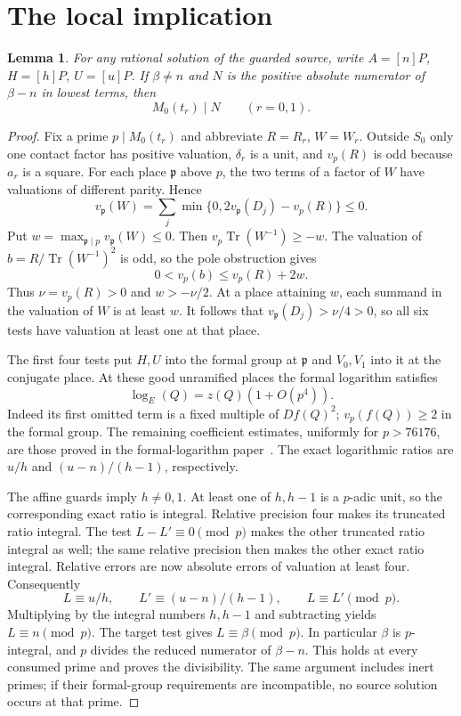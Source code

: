 \documentclass[11pt,a4paper]{article}
\newtheorem{lemma}[theorem]{Lemma}
\DeclareMathOperator{\Tr}{Tr}\DeclareMathOperator{\rad}{rad}
\begin{document}
\section{The local implication}

\begin{lemma}\label{lem:local}
For any rational solution of the guarded source, write
$A=[n]P$, $H=[h]P$, $U=[u]P$.
If $\beta\ne n$ and $N$ is the positive absolute numerator
of $\beta-n$ in lowest terms, then
\[
                         M_0(t_r)\mid N\qquad(r=0,1).
\]
\end{lemma}
\begin{proof}
Fix a prime $p\mid M_0(t_r)$ and abbreviate $R=R_r$, $W=W_r$.
Outside $S_0$ only one contact factor has positive valuation,
$\delta_r$ is a unit, and $v_p(R)$ is odd because $a_r$ is
a square. For each place $\mathfrak p$ above $p$, the two terms
of a factor of $W$ have valuations of different parity. Hence
\[
 v_{\mathfrak p}(W)=\sum_j
       \min\{0,2v_{\mathfrak p}(D_j)-v_p(R)\}\le0.
\]
Put $w=\max_{\mathfrak p\mid p}v_{\mathfrak p}(W)\le0$.
Then $v_p\Tr(W^{-1})\ge-w$.
The valuation of $b=R/\Tr(W^{-1})^2$ is odd, so the pole
obstruction gives
\[
                   0<v_p(b)\le v_p(R)+2w.
\]
Thus $\nu=v_p(R)>0$ and $w>-\nu/2$. At a place attaining
$w$, each summand in the valuation of $W$ is at least $w$.
It follows that $v_{\mathfrak p}(D_j)>\nu/4>0$, so all
six tests have valuation at least one at that place.

The first four tests put $H,U$ into the formal group at
$\mathfrak p$ and $V_0,V_1$ into it at the conjugate place.
At these good unramified places the formal logarithm satisfies
\[
                         \log_E(Q)=z(Q)(1+O(p^4)).
\]
Indeed its first omitted term is a fixed multiple of $Df(Q)^2$;
$v_p(f(Q))\ge2$ in the formal group. The remaining coefficient
estimates, uniformly for $p>76176$, are those proved in the
formal-logarithm paper~\cite{Logs}. The exact logarithmic ratios
are $u/h$ and $(u-n)/(h-1)$, respectively.

The affine guards imply $h\ne0,1$. At least one of $h,h-1$
is a $p$-adic unit, so the corresponding exact ratio is integral.
Relative precision four makes its truncated ratio integral.
The test $L-L'\equiv0\pmod p$ makes the other truncated ratio
integral as well; the same relative precision then makes the
other exact ratio integral. Relative errors are now absolute
errors of valuation at least four. Consequently
\[
 L\equiv u/h,\qquad L'\equiv(u-n)/(h-1),\qquad
 L\equiv L'\pmod p.
\]
Multiplying by the integral numbers $h,h-1$ and subtracting yields
$L\equiv n\pmod p$. The target test gives $L\equiv\beta\pmod p$.
In particular $\beta$ is $p$-integral, and $p$ divides the
reduced numerator of $\beta-n$. This holds at every consumed
prime and proves the divisibility. The same argument includes
inert primes; if their formal-group requirements are incompatible,
no source solution occurs at that prime.
\end{proof}
\end{document}
